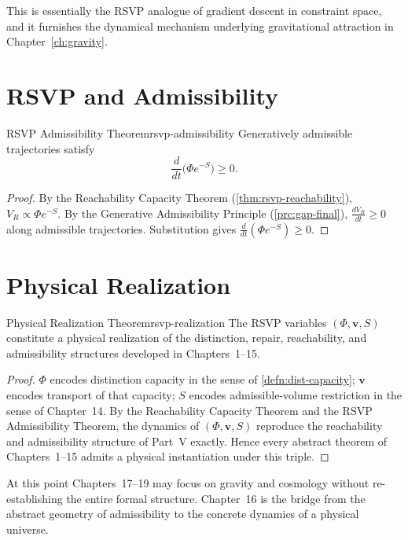 \documentclass[12pt,twoside,openright]{book}
\begin{document}
This is essentially the RSVP analogue of gradient descent
in constraint space, and it furnishes the dynamical
mechanism underlying gravitational attraction in
Chapter~\ref{ch:gravity}.

\section{RSVP and Admissibility}
\label{sec:ch16-admissibility}

\begin{theorem}{RSVP Admissibility Theorem}{rsvp-admissibility}
  Generatively admissible trajectories satisfy
  \[
    \frac{d}{dt}\bigl(\Phi e^{-S}\bigr) \ge 0.
  \]
\end{theorem}

\begin{proof}
  By the Reachability Capacity Theorem
  (\cref{thm:rsvp-reachability}), $V_R \propto \Phi e^{-S}$.
  By the Generative Admissibility Principle
  (\cref{prc:gap-final}), $\frac{dV_R}{dt} \ge 0$ along
  admissible trajectories. Substitution gives
  $\frac{d}{dt}(\Phi e^{-S}) \ge 0$.
\end{proof}

\section{Physical Realization}
\label{sec:ch16-realization}

\begin{theorem}{Physical Realization Theorem}{rsvp-realization}
  The RSVP variables $(\Phi, \mathbf{v}, S)$ constitute a
  physical realization of the distinction, repair,
  reachability, and admissibility structures developed in
  Chapters~1--15.
\end{theorem}

\begin{proof}
  $\Phi$ encodes distinction capacity in the sense of
  \cref{defn:dist-capacity}; $\mathbf{v}$ encodes transport
  of that capacity; $S$ encodes admissible-volume
  restriction in the sense of Chapter~14. By the
  Reachability Capacity Theorem and the RSVP Admissibility
  Theorem, the dynamics of $(\Phi,\mathbf{v},S)$ reproduce
  the reachability and admissibility structure of
  Part~V exactly. Hence every abstract theorem of
  Chapters~1--15 admits a physical instantiation under this
  triple.
\end{proof}

At this point Chapters~17--19 may focus on gravity and
cosmology without re-establishing the entire formal
structure. Chapter~16 is the bridge from the abstract
geometry of admissibility to the concrete dynamics of a
physical universe.
\end{document}
